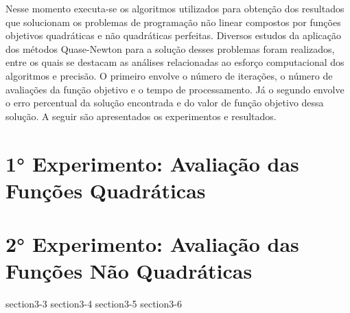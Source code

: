 
Nesse momento executa-se os algoritmos utilizados para obtenção dos resultados que solucionam os problemas de programação não linear compostos por funções objetivos quadráticas e não quadráticas perfeitas. Diversos estudos da aplicação dos métodos Quase-Newton para a solução desses problemas foram realizados, entre os quais se destacam as análises relacionadas ao esforço computacional dos algoritmos e precisão. O primeiro envolve o número de iterações, o número de avaliações da função objetivo e o tempo de processamento. Já o segundo envolve o erro percentual da solução encontrada e do valor de função objetivo dessa solução. A seguir são apresentados os experimentos e resultados.

\section{1° Experimento: Avaliação das Funções Quadráticas}
     
     
    
\newpage
\section{2° Experimento: Avaliação das Funções Não Quadráticas}
    
    
      
     
\newpage   
{section3-3}
{section3-4}
{section3-5}
{section3-6}